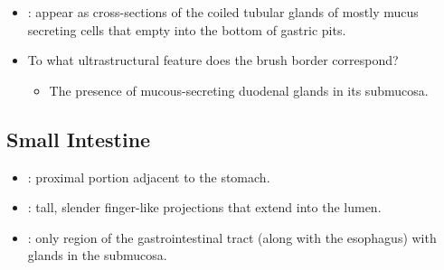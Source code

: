 \begin{itemize}
\begin{multicols}{2}
\begin{itemize}
    \item {}: appear as cross-sections of the coiled tubular glands of mostly mucus secreting cells that empty into the bottom of gastric pits. 
    
    \begin{center}
    \end{center}

  \end{itemize}
  \end{multicols}
  \begin{itemize}
    \item To what ultrastructural feature does the brush border correspond?
      \begin{itemize}
        \item The presence of mucous-secreting duodenal glands in its submucosa.
      \end{itemize}
  \end{itemize}

  \newpage

  \subsection{Small Intestine}\label{Small Intestine}
  \begin{multicols}{2}
  \begin{itemize}
    \item {}: proximal portion adjacent to the stomach. 
    
    \begin{center}
    \end{center}

    \item {}:  tall, slender finger-like projections that extend into the lumen.
    
    \begin{center}
    \end{center}
    
    \item {}: only region of the gastrointestinal tract (along with the esophagus) with glands in the submucosa.
    
    \begin{center}
    \end{center}
    

\end{itemize}
\end{multicols}
\end{itemize}

